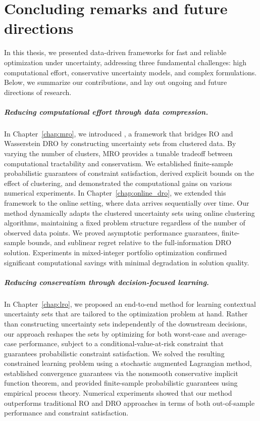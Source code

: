 \chapter{Concluding remarks and future directions}
\label{chap:conc}

In this thesis, we presented data-driven frameworks for fast and reliable optimization under uncertainty, addressing three fundamental challenges: high computational effort, conservative uncertainty models, and complex formulations.
Below, we summarize our contributions, and lay out ongoing and future directions of research. 

\paragraph{Reducing computational effort through data compression.}
In Chapter~\ref{chap:mro}, we introduced , a framework that bridges \gls{RO} and Wasserstein \gls{DRO} by constructing uncertainty sets from clustered data.
By varying the number of clusters, \gls{MRO} provides a tunable tradeoff between computational tractability and conservatism.
We established finite-sample probabilistic guarantees of constraint satisfaction, derived explicit bounds on the effect of clustering, and demonstrated the computational gains on various numerical experiments. 
In Chapter~\ref{chap:online_dro}, we extended this framework to the online setting, where data arrives sequentially over time.
Our method dynamically adapts the clustered uncertainty sets using online clustering algorithms, maintaining a fixed problem structure regardless of the number of observed data points.
We proved asymptotic performance guarantees, finite-sample bounds, and sublinear regret relative to the full-information \gls{DRO} solution.
Experiments in mixed-integer portfolio optimization confirmed significant computational savings with minimal degradation in solution quality.

\paragraph{Reducing conservatism through decision-focused learning.}
In Chapter~\ref{chap:lro}, we proposed an end-to-end method for learning contextual uncertainty sets that are tailored to the optimization problem at hand.
Rather than constructing uncertainty sets independently of the downstream decisions, our approach reshapes the sets by optimizing for both worst-case and average-case performance, subject to a conditional-value-at-risk constraint that guarantees probabilistic constraint satisfaction.
We solved the resulting constrained learning problem using a stochastic augmented Lagrangian method, established convergence guarantees via the nonsmooth conservative implicit function theorem, and provided finite-sample probabilistic guarantees using empirical process theory.
Numerical experiments showed that our method outperforms traditional \gls{RO} and \gls{DRO} approaches in terms of both out-of-sample performance and constraint satisfaction.


